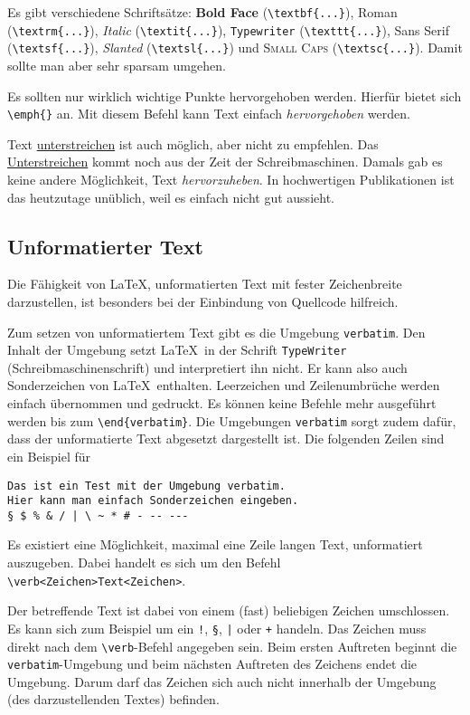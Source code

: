 \documentclass{llncs}
\begin{document}
Es gibt verschiedene Schriftsätze: \textbf{Bold Face} (\verb!\textbf{...}!), \textrm{Roman} (\verb!\textrm{...}!), \textit{Italic} (\verb!\textit{...}!), \texttt{Typewriter} (\verb!\texttt{...}!), \textsf{Sans Serif} (\verb!\textsf{...}!), \textsl{Slanted} (\verb!\textsl{...}!) und \textsc{Small Caps} (\verb!\textsc{...}!). Damit sollte man aber sehr sparsam umgehen.

Es sollten nur wirklich wichtige Punkte hervorgehoben werden. Hierfür bietet sich \verb!\emph{}! an. Mit diesem Befehl kann Text einfach \emph{hervorgehoben} werden.

Text \underline{unterstreichen} ist auch möglich, aber nicht zu empfehlen. Das \underline{Unterstreichen} kommt noch aus der Zeit der Schreibmaschinen. Damals gab es keine andere Möglichkeit, Text \emph{hervorzuheben}. In hochwertigen Publikationen ist das heutzutage unüblich, weil es einfach nicht gut aussieht.

\subsection{Unformatierter Text}
Die Fähigkeit von \LaTeX, unformatierten Text mit fester Zeichenbreite darzustellen, ist 
besonders bei der Einbindung von Quellcode hilfreich.

Zum setzen von unformatiertem Text gibt es die Umgebung \texttt{verbatim}. Den Inhalt der Umgebung setzt \LaTeX\ in der Schrift \texttt{TypeWriter} (Schreibmaschinenschrift) und interpretiert ihn nicht. Er kann also auch Sonderzeichen von \LaTeX\ enthalten. Leerzeichen und Zeilenumbrüche werden einfach übernommen und gedruckt. Es können keine Befehle mehr ausgeführt werden bis zum \verb!\end{verbatim}!. Die Umgebungen \texttt{verbatim} sorgt zudem dafür, dass der unformatierte Text abgesetzt dargestellt ist. Die folgenden Zeilen sind ein Beispiel für 

\begin{verbatim}
Das ist ein Test mit der Umgebung verbatim.
Hier kann man einfach Sonderzeichen eingeben.
§ $ % & / | \ ~ * # - -- ---
\end{verbatim}

Es existiert eine Möglichkeit, maximal eine Zeile langen Text, unformatiert auszugeben. Dabei handelt es sich um den Befehl \verb!\verb<Zeichen>Text<Zeichen>!.

Der betreffende Text ist dabei von einem (fast) beliebigen Zeichen umschlossen. Es kann sich zum Beispiel um ein \verb+!+, \verb!§!, \verb!|! oder \verb!+! handeln. Das Zeichen muss direkt nach dem \verb!\verb!-Befehl angegeben sein. Beim ersten Auftreten beginnt die \verb!verbatim!-Umgebung und beim nächsten Auftreten des Zeichens endet die Umgebung. Darum darf das Zeichen sich auch nicht innerhalb der Umgebung (des darzustellenden Textes) befinden.
\end{document}
